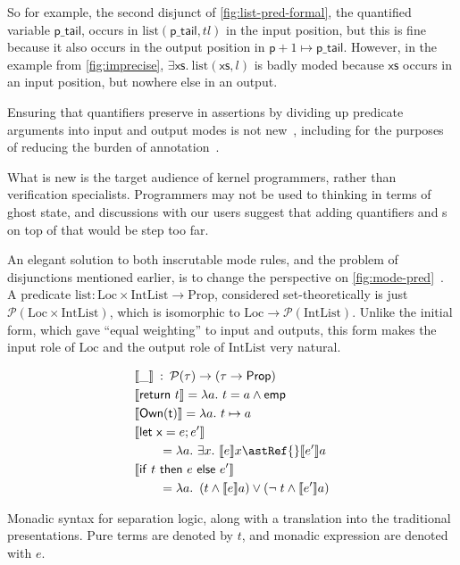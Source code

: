 So for example, the second disjunct of \cref{fig:list-pred-formal}, the
quantified variable $\mathsf{p\_tail}$, occurs in $\mathrm{list}
(\mathsf{p\_tail}, {tl})$ in the input position, but this is fine because it also
occurs in the output position in $\mathsf{p} + 1 \mapsto{} \mathsf{p\_tail}$.
However, in the example from \cref{fig:imprecise}, $\exists \mathsf{xs}. \
\mathrm{list}(\mathsf{xs},l)$ is badly moded because $\mathsf{xs}$ occurs in an
input position, but nowhere else in an output.

Ensuring that quantifiers preserve  in assertions by
dividing up predicate arguments into input and output modes is
not new~,
including for the purposes of reducing the burden of
annotation~.

What is new is the target audience of kernel programmers, rather than
verification specialists. Programmers may not be used to thinking in terms of
ghost state, and discussions with our users suggest that adding quantifiers and
\kl{mode}s on top of that would be step too far.

An elegant solution to both inscrutable mode rules, and the problem of
disjunctions mentioned earlier, is to change the perspective on
\cref{fig:mode-pred}~. A predicate
$\mathrm{list} : \mathrm{Loc} \times \mathrm{IntList} \rightarrow
\mathrm{Prop}$, considered set-theoretically is just $\mathcal{P} (\mathrm{Loc}
\times \mathrm{IntList})$, which is isomorphic to $\mathrm{Loc} \rightarrow
\mathcal{P} (\mathrm{IntList})$. Unlike the initial form, which gave ``equal
weighting'' to input and outputs, this form makes the input role of
$\mathrm{Loc}$ and the output role of $\mathrm{IntList}$ very natural.

\begin{marginfigure}
    \begin{align*}
        &\llbracket \_ \rrbracket \::\: \mathcal{P}(\tau) \rightarrow (\tau \rightarrow \mathsf{Prop}) \\
        &\llbracket \mathsf{return}\ t \rrbracket = \lambda a.\ t = a \wedge{} \mathsf{emp} \\
        &\llbracket \mathsf{Own(t)} \rrbracket = \lambda a.\ t \mapsto{} a \\
        &\llbracket \mathsf{let\ x} = e; e' \rrbracket \\
        &\qquad = \lambda a.\ \exists x.\ \llbracket e \rrbracket x \astRef{} \llbracket e' \rrbracket a \\
        &\llbracket \mathsf{if}\ t\ \mathsf{then}\ e\ \mathsf{else}\ e' \rrbracket \\
        &\qquad = \lambda a.\  \left( t \wedge \llbracket e \rrbracket a \right) \vee \left( \neg\;t \wedge \llbracket e' \rrbracket a \right)
    \end{align*}
    \caption{Monadic syntax for separation logic, along with a translation into the traditional presentations. Pure
        terms are denoted by $t$, and monadic expression are denoted with $e$.}\label{fig:monad-sl}
\end{marginfigure}

